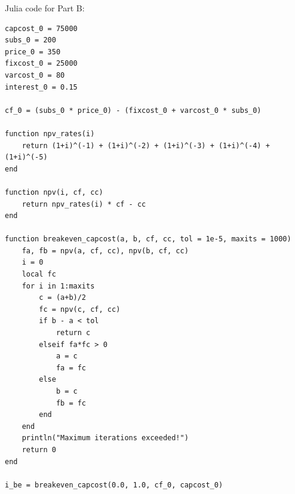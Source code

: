\documentclass[12pt, letterpaper, parskip = full]{article}
\begin{document}
\newpage

Julia code for Part B:

\begin{verbatim}
capcost_0 = 75000
subs_0 = 200
price_0 = 350
fixcost_0 = 25000
varcost_0 = 80
interest_0 = 0.15

cf_0 = (subs_0 * price_0) - (fixcost_0 + varcost_0 * subs_0)

function npv_rates(i)
    return (1+i)^(-1) + (1+i)^(-2) + (1+i)^(-3) + (1+i)^(-4) + (1+i)^(-5)
end

function npv(i, cf, cc)
    return npv_rates(i) * cf - cc
end

function breakeven_capcost(a, b, cf, cc, tol = 1e-5, maxits = 1000)
    fa, fb = npv(a, cf, cc), npv(b, cf, cc)
    i = 0
    local fc
    for i in 1:maxits
        c = (a+b)/2
        fc = npv(c, cf, cc)
        if b - a < tol
            return c
        elseif fa*fc > 0
            a = c
            fa = fc
        else
            b = c
            fb = fc
        end
    end
    println("Maximum iterations exceeded!")
    return 0
end

i_be = breakeven_capcost(0.0, 1.0, cf_0, capcost_0)
\end{verbatim}
\end{document}
